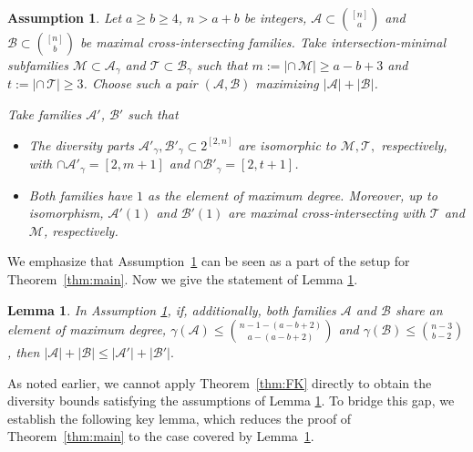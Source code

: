 \documentclass[11pt]{article}
\newcommand{\m}{\mathcal}
\newtheorem{lemma}[theorem]{Lemma}
\newtheorem{assumption}[theorem]{Assumption}
\begin{document}
\begin{assumption}\label{12-14-2}
Let $a\ge b\ge 4$, $n> a+b$ be integers, $\mathcal{A}\subset {[n]\choose a}$ and $\mathcal{B}\subset {[n]\choose b}$ be maximal cross-intersecting families. 
Take intersection-minimal subfamilies $\mathcal{M}\subset \mathcal{A}_\gamma$ and $\mathcal{T}\subset \mathcal{B}_\gamma$ such that  $m:=|\cap\, \mathcal{M}|\ge a-b+3$ and  $t:=|\cap\,\mathcal{T}|\ge 3$. Choose such a pair $(\mathcal A,\mathcal B)$ maximizing
$|\mathcal A|+|\mathcal B|$.

Take families  $\m A'$, $\m B'$ such that 
\begin{itemize}
\item The diversity parts $\m A'_\gamma, \m B'_\gamma\subset 2^{[2,n]}$ are isomorphic to $\m M, \m T,$ respectively, with $\cap \m A'_\gamma = [2,m+1]$ and $\cap \m B'_\gamma = [2,t+1]$.
\item Both families have $1$ as the element of maximum degree. Moreover, up to isomorphism,
$\m A'(1)$ and $\m B'(1)$ are maximal  cross-intersecting with $\m T$ and $\m M$, respectively. 
\end{itemize}
\end{assumption}

We emphasize that Assumption~\ref{12-14-2} can be seen  as a part of the setup for Theorem~\ref{thm:main}. 
Now we give the statement of Lemma \ref{10-25-2}.

\begin{lemma}\label{10-25-2}
In Assumption \ref{12-14-2}, if, additionally, both families $\m A$ and $\m B$ share an element of maximum degree, $\gamma(\mathcal{A})\le {n-1-(a-b+2)\choose a-(a-b+2)}$ and $\gamma(\mathcal{B})\le {n-3\choose b-2}$, 
then 
$
|\mathcal{A}|+|\mathcal{B}|\le |\mathcal{A}'|+|\mathcal{B}'|.
$
\end{lemma}

As noted earlier, we cannot apply Theorem~\ref{thm:FK} directly to obtain the diversity bounds satisfying the assumptions of Lemma \ref{10-25-2}. To bridge this gap,
we establish the following key lemma, which reduces the proof of Theorem~\ref{thm:main} to the case covered by Lemma~\ref{10-25-2}. 
\end{document}
